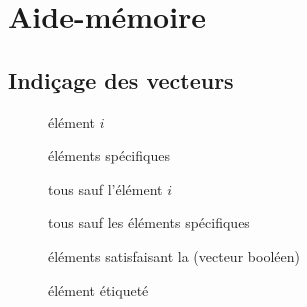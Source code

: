 
\chapter{Aide-mémoire}
\label{chap:aide-memoire}

\begingroup

\smaller
\setsecheadstyle{\normalfont\large\sffamily\bfseries\raggedright}

\begin{multicols}{2}
  \section*{Indiçage des vecteurs}

  \begin{description}
  \item[] élément $i$
  \item[] éléments spécifiques
  \item[] tous sauf l'élément $i$
  \item[] tous sauf les éléments spécifiques
  \item[] éléments satisfaisant la
     (vecteur booléen)
  \item[] élément étiqueté 
  \end{description}
\end{multicols}

\endgroup

